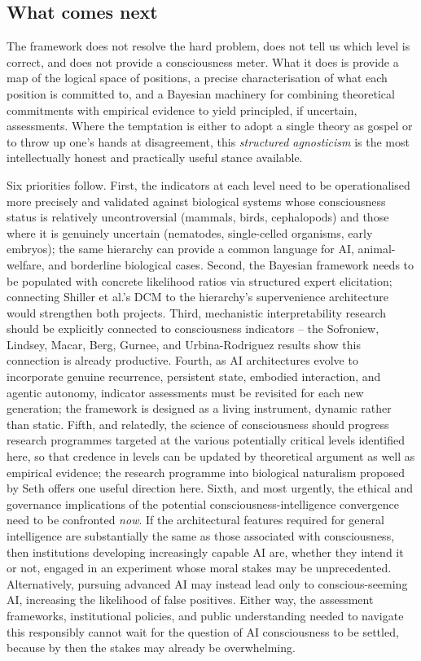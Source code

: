 \documentclass[11pt, a4paper, onecolumn, gdm]{google}
\begin{document}
\subsection{What comes next}\label{what-comes-next}

The framework does not resolve the hard problem, does not tell us which level is correct, and does not provide a consciousness meter.
What it does is provide a map of the logical space of positions, a precise characterisation of what each position is committed to, and a Bayesian machinery for combining theoretical commitments with empirical evidence to yield principled, if uncertain, assessments.
Where the temptation is either to adopt a single theory as gospel or to throw up one's hands at disagreement, this \emph{structured agnosticism} is the most intellectually honest and practically useful stance available.

Six priorities follow.
First, the indicators at each level need to be operationalised more precisely and validated against biological systems whose consciousness status is relatively uncontroversial (mammals, birds, cephalopods) and those where it is genuinely uncertain (nematodes, single-celled organisms, early embryos); the same hierarchy can provide a common language for AI, animal-welfare, and borderline biological cases.
Second, the Bayesian framework needs to be populated with concrete likelihood ratios via structured expert elicitation; connecting Shiller et al.'s DCM to the hierarchy's supervenience architecture would strengthen both projects.
Third, mechanistic interpretability research should be explicitly connected to consciousness indicators -- the Sofroniew, Lindsey, Macar, Berg, Gurnee, and Urbina-Rodriguez results show this connection is already productive.
Fourth, as AI architectures evolve to incorporate genuine recurrence, persistent state, embodied interaction, and agentic autonomy, indicator assessments must be revisited for each new generation; the framework is designed as a living instrument, dynamic rather than static.
Fifth, and relatedly, the science of consciousness should progress research programmes targeted at the various potentially critical levels identified here, so that credence in levels can be updated by theoretical argument as well as empirical evidence; the research programme into biological naturalism proposed by Seth offers one useful direction here.
Sixth, and most urgently, the ethical and governance implications of the potential consciousness-intelligence convergence need to be confronted \emph{now}.
If the architectural features required for general intelligence are substantially the same as those associated with consciousness, then institutions developing increasingly capable AI are, whether they intend it or not, engaged in an experiment whose moral stakes may be unprecedented. Alternatively, pursuing advanced AI may instead lead only to conscious-seeming AI, increasing the likelihood of false positives. Either way, the assessment frameworks, institutional policies, and public understanding needed to navigate this responsibly cannot wait for the question of AI consciousness to be settled, because by then the stakes may already be overwhelming.
\end{document}
